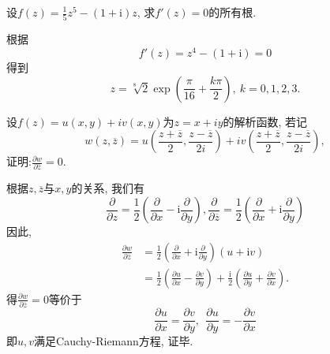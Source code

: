 \begin{yyEx}
	设$f(z) = \frac{1}{5}z^5 - (1+\mathrm{i})z$, 求$f'(z) = 0$的所有根.
\end{yyEx}

\begin{yySolution}
	根据\begin{equation*}
		f'(z) = z^4 - (1+\mathrm{i}) = 0
	\end{equation*}
	得到\begin{equation*}
		z = \sqrt[8]{2} \exp(\frac{\pi}{16}+\frac{k\pi}{2}),~k = 0,1,2,3.
	\end{equation*}
\end{yySolution}

\begin{yyEx}
	设$f(z) = u(x,y)+ iv(x,y)$为$z = x+iy$的解析函数, 若记
	\begin{equation*}
		w(z,\overline{z}) = u\left( \frac{z+\overline{z}}{2},\frac{z-\overline{z}}{2i} \right) + iv\left( \frac{z+\overline{z}}{2},\frac{z-\overline{z}}{2i} \right),
	\end{equation*}
	证明:$\frac{\partial w}{\partial \overline{z}} = 0$.
\end{yyEx}

\begin{yyProof}
	根据$z,\overline{z}$与$x,y$的关系, 我们有\begin{equation*}
		\frac{\partial}{\partial z} = \frac{1}{2}\left(\frac{\partial}{\partial x}-\mathrm{i}\frac{\partial}{\partial y}  \right),\frac{\partial}{\partial \overline{z}} = \frac{1}{2}\left(\frac{\partial}{\partial x}+\mathrm{i}\frac{\partial}{\partial y}  \right)
	\end{equation*}
	因此,\begin{equation*}
		\begin{split}
			\frac{\partial w}{\partial \overline{z}} &= \frac{1}{2}\left(\frac{\partial}{\partial x}+\mathrm{i}\frac{\partial}{\partial y}  \right)(u+\mathrm{i}v) \\
			&= \frac{1}{2}\left(\frac{\partial u}{\partial x} - \frac{\partial v}{\partial y}\right) + \frac{\mathrm{i}}{2}\left(\frac{\partial u}{\partial y} + \frac{\partial v}{\partial x}\right).
		\end{split}
	\end{equation*}
	得$\frac{\partial w}{\partial \overline{z}} = 0$等价于\begin{equation*}
		\frac{\partial u}{\partial x} = \frac{\partial v}{\partial y},~~\frac{\partial u}{\partial y} = - \frac{\partial v}{\partial x}
	\end{equation*}
	即$u, v$满足Cauchy-Riemann方程, 证毕.
\end{yyProof}

